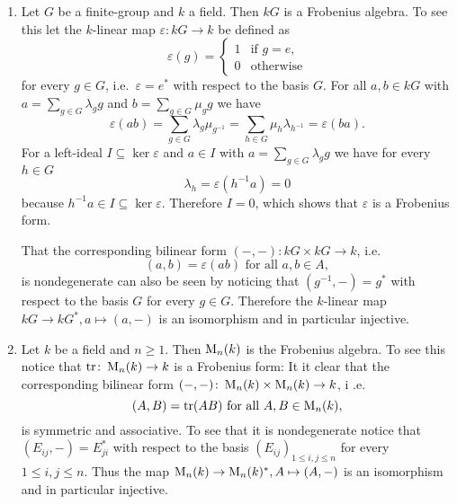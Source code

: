 \begin{expls}
  \begin{enumerate}[label=\emph{\alph*)},leftmargin=*]
    \item
      Let $G$ be a finite-group and $k$ a field. Then $kG$ is a Frobenius algebra. To see this let the $k$-linear map $\varepsilon \colon kG \to k$ be defined as
      \[
        \varepsilon(g) =
        \begin{cases}
          1 & \text{if } g = e, \\
          0 & \text{otherwise}
        \end{cases}
      \]
      for every $g \in G$, i.e.\ $\varepsilon = e^*$ with respect to the basis $G$. For all $a,b \in kG$ with $a = \sum_{g \in G} \lambda_g g$ and $b = \sum_{g \in G} \mu_g g$ we have
      \[
        \varepsilon(ab)
        = \sum_{g \in G} \lambda_g \mu_{g^{-1}}
        = \sum_{h \in G} \mu_h \lambda_{h^{-1}}
        =  \varepsilon(ba).
      \]
      For a left-ideal $I \subseteq \ker \varepsilon$ and $a \in I $ with $a = \sum_{g \in G} \lambda_g g$ we have for every $h \in G$
      \[
        \lambda_h = \varepsilon\left( h^{-1} a \right) = 0
      \]
      because $h^{-1} a \in I \subseteq \ker \varepsilon$. Therefore $I = 0$, which shows that $\varepsilon$ is a Frobenius form.
      
      That the corresponding bilinear form $(-,-) \colon kG \times kG \to k$, i.e.\
      \[
        (a,b) = \varepsilon(ab) \text{ for all } a,b \in A,
      \]
      is nondegenerate can also be seen by noticing that $(g^{-1},-) = g^*$ with respect to the basis $G$ for every $g \in G$. Therefore the $k$-linear map $kG \to kG^*, a \mapsto (a,-)$ is an isomorphism and in particular injective.
    \item
      Let $k$ be a field and $n \geq 1$. Then $\operatorname{M}_n(k)$ is the Frobenius algebra. To see this notice that $\operatorname{tr} \colon \operatorname{M}_n(k) \to k$ is a Frobenius form: It it clear that the corresponding bilinear form $(-,-) \colon \operatorname{M}_n(k) \times \operatorname{M}_n(k) \to k$, i .e.\
      \[
        (A,B) = \operatorname{tr}(AB) \text{ for all } A,B \in \operatorname{M}_n(k),
      \]
      is symmetric and associative. To see that it is nondegenerate notice that $(E_{ij}, -) = E_{ji}^*$ with respect to the basis $(E_{ij})_{1 \leq i,j \leq n}$ for every $1 \leq i,j \leq n$. Thus the map $\operatorname{M}_n(k) \to \operatorname{M}_n(k)^*, A \mapsto (A,-)$ is an isomorphism and in particular injective.
  \end{enumerate}
\end{expls}



